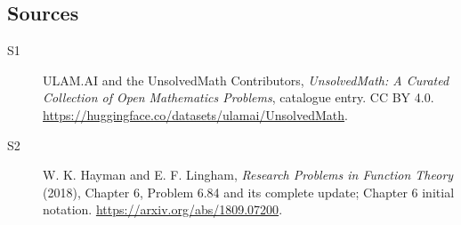 \documentclass[11pt]{article}
\begin{document}
\subsection{Sources}
\begin{description}
\item[\hypertarget{source:statement:1}{S1}] ULAM.AI and the UnsolvedMath Contributors, \emph{UnsolvedMath: A Curated Collection of Open Mathematics Problems}, catalogue entry. CC BY 4.0. \url{https://huggingface.co/datasets/ulamai/UnsolvedMath}.
\item[\hypertarget{source:statement:2}{S2}] W. K. Hayman and E. F. Lingham, \emph{Research Problems in Function Theory} (2018), Chapter 6, Problem 6.84 and its complete update; Chapter 6 initial notation. \url{https://arxiv.org/abs/1809.07200}.
\end{description}
\label{end:statement}
\end{document}
